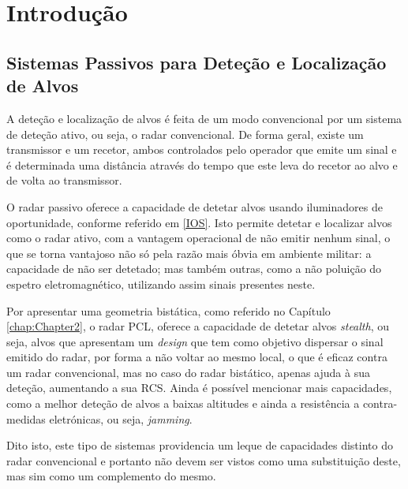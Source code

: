 % 
\chapter{Introdução} %
\label{chap:Chapter1} %


%




\section{Sistemas Passivos para Deteção e Localização de Alvos}
A deteção e localização de alvos é feita de um modo convencional por um sistema de deteção ativo, ou seja, o radar convencional. De forma geral, existe um transmissor e um recetor, ambos controlados pelo operador que emite um sinal e é determinada uma distância através do tempo que este leva do recetor ao alvo e de volta ao transmissor.\par 
O radar passivo oferece a capacidade de detetar alvos usando iluminadores de oportunidade, conforme referido em \ref{IOS}. Isto permite detetar e localizar alvos como o radar ativo, com a vantagem operacional de não emitir nenhum sinal, o que se torna vantajoso não só pela razão mais óbvia em ambiente militar: a capacidade de não ser detetado; mas também outras, como a não poluição do espetro eletromagnético, utilizando assim sinais presentes neste.\par 
Por apresentar uma geometria bistática, como referido no Capítulo \ref{chap:Chapter2}, o radar \gls{PCL}, oferece a capacidade de detetar alvos \textit{stealth}, ou seja, alvos que apresentam um \textit{design} que tem como objetivo dispersar o sinal emitido do radar, por forma a não voltar ao mesmo local, o que é eficaz contra um radar convencional, mas no caso do radar bistático, apenas ajuda à sua deteção, aumentando a sua \gls{RCS}. Ainda é possível mencionar mais capacidades, como a melhor deteção de alvos a baixas altitudes e ainda a resistência a contra-medidas eletrónicas, ou seja, \textit{jamming}.\par
Dito isto, este tipo de sistemas providencia um leque de capacidades distinto do radar convencional e portanto não devem ser vistos como uma substituição deste, mas sim como um complemento do mesmo. 

